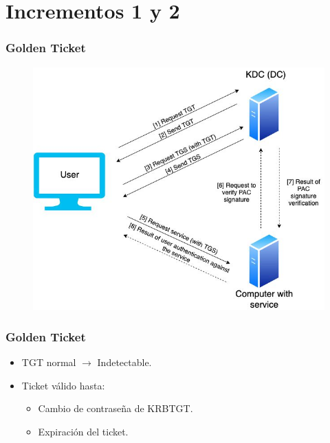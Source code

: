 \documentclass[a4paper,10pt]{beamer}
\begin{document}
\section{Incrementos 1 y 2}
\begin{frame}[fragile]
	\frametitle{Golden Ticket}

	\begin{figure}[H]
		\centering
		\includegraphics[width=.8\textwidth]{../figuras/TGT_TGS_PAC.jpg}
	\end{figure}

\end{frame}

\begin{frame}[fragile]
	\frametitle{Golden Ticket}

	\begin{itemize}
		\item TGT normal $\xrightarrow{}$ Indetectable. %
		\item Ticket válido hasta:
		\begin{itemize}
			\item Cambio de contraseña de KRBTGT. %
			\item Expiración del ticket.
		\end{itemize}
	\end{itemize}
\end{frame}
\end{document}
